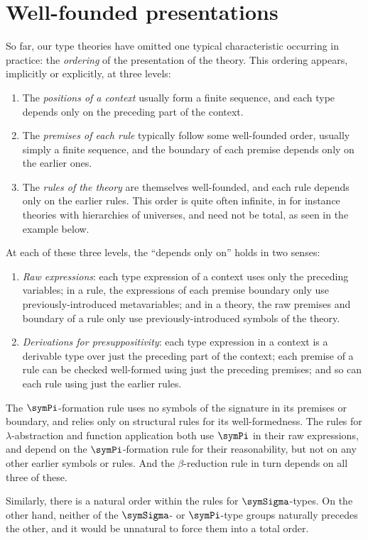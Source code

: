 
\section{Well-founded presentations}
\label{sec:well-founded-type-theories}

So far, our type theories have omitted one typical characteristic occurring in practice: the \emph{ordering} of the presentation of the theory.
%
This ordering appears, implicitly or explicitly, at three levels:
\begin{enumerate}
\item The \emph{positions of a context} usually form a finite sequence, and each type depends only on the preceding part of the context.
\item The \emph{premises of each rule} typically follow some well-founded order, usually simply a finite sequence, and the boundary of each premise depends only on the earlier ones.
\item The \emph{rules of the theory} are themselves well-founded, and each rule depends only on the earlier rules. This order is quite often infinite, in for instance theories with hierarchies of universes, and need not be total, as seen in the example below.
\end{enumerate}

At each of these three levels, the “depends only on” holds in two senses:
\begin{enumerate}
\item \emph{Raw expressions}: each type expression of a context uses only the preceding variables; in a rule, the expressions of each premise boundary only use previously-introduced metavariables; and in a theory, the raw premises and boundary of a rule only use previously-introduced symbols of the theory.
\item \emph{Derivations for presuppositivity}: each type expression in a context is a derivable type over just the preceding part of the context; each premise of a rule can be checked well-formed using just the preceding premises; and so can each rule using just the earlier rules.
\end{enumerate}

\begin{example}
The $\symPi$-formation rule uses no symbols of the signature in its premises or boundary, and relies only on structural rules for its well-formedness.
%
The rules for $\lambda$-abstraction and function application both use $\symPi$ in their raw expressions, and depend on the $\symPi$-formation rule for their reasonability, but not on any other earlier symbols or rules.
%
And the $\beta$-reduction rule in turn depends on all three of these.

Similarly, there is a natural order within the rules for $\symSigma$-types.
%
On the other hand, neither of the $\symSigma$- or $\symPi$-type groups naturally precedes the other, and it would be unnatural to force them into a total order.
\end{example}


